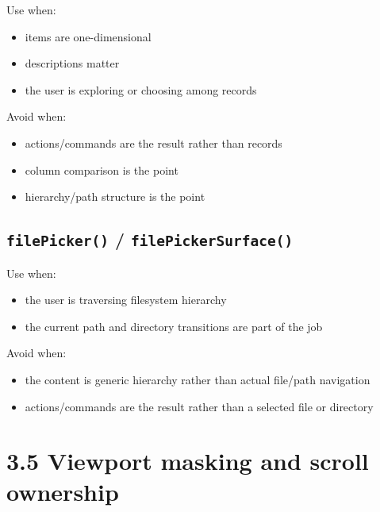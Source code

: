 Use when:

\begin{itemize}
\tightlist
\item
  items are one-dimensional
\item
  descriptions matter
\item
  the user is exploring or choosing among records
\end{itemize}

Avoid when:

\begin{itemize}
\tightlist
\item
  actions/commands are the result rather than records
\item
  column comparison is the point
\item
  hierarchy/path structure is the point
\end{itemize}

\subsection{\texorpdfstring{\texttt{f\allowbreak{}i\allowbreak{}l\allowbreak{}e\allowbreak{}P\allowbreak{}i\allowbreak{}c\allowbreak{}k\allowbreak{}e\allowbreak{}r\allowbreak{}(\allowbreak{})} / \texttt{f\allowbreak{}i\allowbreak{}l\allowbreak{}e\allowbreak{}P\allowbreak{}i\allowbreak{}c\allowbreak{}k\allowbreak{}e\allowbreak{}r\allowbreak{}S\allowbreak{}u\allowbreak{}r\allowbreak{}f\allowbreak{}a\allowbreak{}c\allowbreak{}e\allowbreak{}(\allowbreak{})}}{ / }}\label{record-023-filepicker-filepickersurface}

Use when:

\begin{itemize}
\tightlist
\item
  the user is traversing filesystem hierarchy
\item
  the current path and directory transitions are part of the job
\end{itemize}

Avoid when:

\begin{itemize}
\tightlist
\item
  the content is generic hierarchy rather than actual file/path navigation
\item
  actions/commands are the result rather than a selected file or directory
\end{itemize}

\section{3.5 Viewport masking and scroll ownership}\label{record-023-viewport-masking-and-scroll-ownership}


